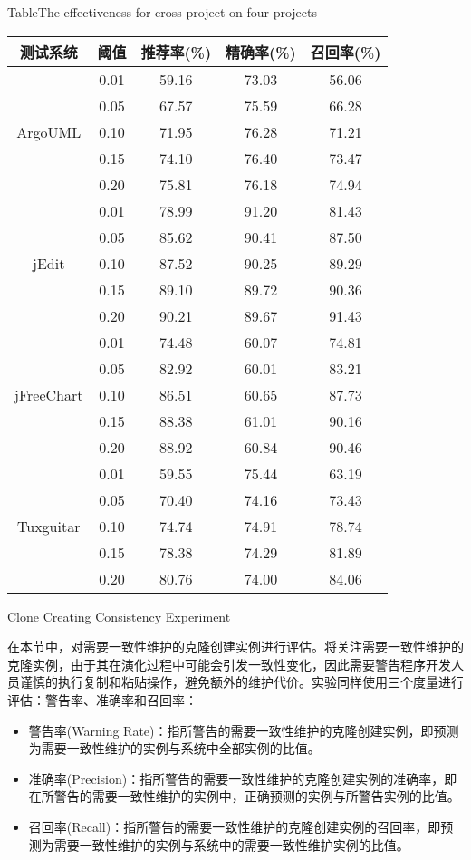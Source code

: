 \begin{table}[htbp]
{Table$\!$}{The effectiveness for cross-project on four projects}
\vspace{0.5em}
\centering
\wuhao
\begin{tabular}{ccccc}
\toprule[1.5pt]
{测试系统}&{阈值}&{推荐率(\%)}&{精确率(\%)}&{召回率(\%)}\\
\midrule[1pt]
\multirow{5}{*}{ArgoUML}
&0.01&	59.16&	73.03&	56.06\\
&0.05&	67.57&	75.59&	66.28\\
&0.10&	71.95&	76.28&	71.21\\
&0.15&	74.10&	76.40&	73.47\\
&0.20&	75.81&	76.18&	74.94\\
\hline
\multirow{5}{*}{jEdit}
&0.01&	78.99&	91.20&	81.43\\
&0.05&	85.62&	90.41&	87.50\\
&0.10&	87.52&	90.25&	89.29\\
&0.15&	89.10&	89.72&	90.36\\
&0.20&	90.21&	89.67&	91.43\\
\hline
\multirow{5}{*}{jFreeChart}
&0.01&	74.48&	60.07&	74.81\\
&0.05&	82.92&	60.01&	83.21\\
&0.10&	86.51&	60.65&	87.73\\
&0.15&	88.38&	61.01&	90.16\\
&0.20&	88.92&	60.84&	90.46\\
\hline
\multirow{5}{*}{Tuxguitar}
&0.01&	59.55&	75.44&	63.19\\
&0.05&	70.40&	74.16&	73.43\\
&0.10&	74.74&	74.91&	78.74\\
&0.15&	78.38&	74.29&	81.89\\
&0.20&	80.76&	74.00&	84.06\\
\bottomrule[1.5pt]
\end{tabular}
\end{table}

{Clone Creating Consistency Experiment}

在本节中，对需要一致性维护的克隆创建实例进行评估。将关注需要一致性维护的克隆实例，由于其在演化过程中可能会引发一致性变化，因此需要警告程序开发人员谨慎的执行复制和粘贴操作，避免额外的维护代价。实验同样使用三个度量进行评估：警告率、准确率和召回率：
\begin{itemize}
\item	
警告率(Warning Rate)：指所警告的需要一致性维护的克隆创建实例，即预测为需要一致性维护的实例与系统中全部实例的比值。
\item	
准确率(Precision)：指所警告的需要一致性维护的克隆创建实例的准确率，即在所警告的需要一致性维护的实例中，正确预测的实例与所警告实例的比值。
\item	
召回率(Recall)：指所警告的需要一致性维护的克隆创建实例的召回率，即预测为需要一致性维护的实例与系统中的需要一致性维护实例的比值。
\end{itemize}

